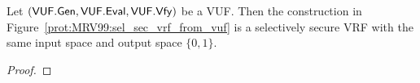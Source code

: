 \begin{theorem}
	\label{theo:MRV99:vuf_to_sel_secure_vrf}
	Let $(\mathsf{VUF.Gen}, \mathsf{VUF.Eval}, \mathsf{VUF.Vfy})$ be a VUF. Then the construction in Figure~\ref{prot:MRV99:sel_sec_vrf_from_vuf} is a selectively secure VRF with the same input space and output space $\{0,1\}$.
\end{theorem}
\begin{proof}
\end{proof}